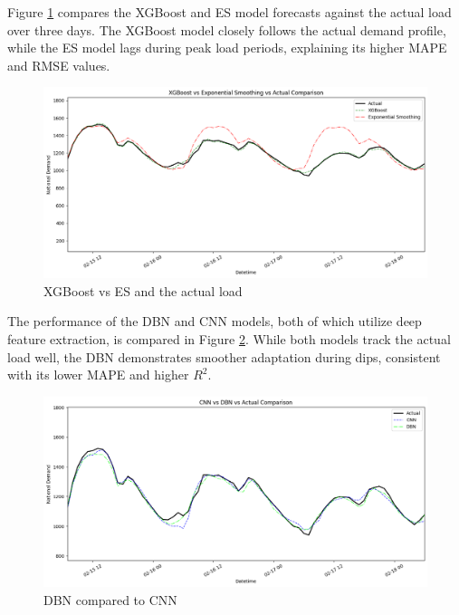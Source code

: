 Figure \ref{fig:xgboostvsexpsmoothing} compares the XGBoost and ES model forecasts against the actual load over three days. The XGBoost model closely follows the actual demand profile, while the ES model lags during peak load periods, explaining its higher MAPE and RMSE values.

 \begin{figure}[h!]
 	\centering
 	\includegraphics[width=0.75\linewidth]{Chapters/images/results/xgboost_vs_expsmoothing}
 	\caption{XGBoost vs ES and the actual load}
 	\label{fig:xgboostvsexpsmoothing}
 \end{figure}
 
 The performance of the DBN and CNN models, both of which utilize deep feature extraction, is compared in Figure \ref{fig:cnnvsdbnactual}. While both models track the actual load well, the DBN demonstrates smoother adaptation during dips, consistent with its lower MAPE and higher $R^2$. 
 \begin{figure}[h!]
 	\centering
 	\includegraphics[width=0.75\linewidth]{Chapters/images/results/cnn_vs_dbn_actual}
 	\caption{DBN compared to CNN}
 	\label{fig:cnnvsdbnactual}
 \end{figure}
 
